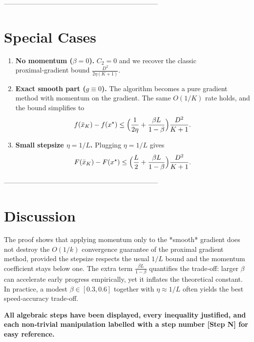 \documentclass{article}
\begin{document}
--------------------------------------------------------------------

\section*{Special Cases}
\begin{enumerate}
    \item \textbf{No momentum ($\beta=0$).}  $C_{2}=0$ and we recover the classic proximal‑gradient bound $\frac{D^{2}}{2\eta(K+1)}$.
    \item \textbf{Exact smooth part ($g\equiv0$).}  The algorithm becomes a pure gradient method with momentum on the gradient.  The same $O(1/K)$ rate holds, and the bound simplifies to
    \[
    f(\bar x_{K})-f(x^{\star})\le
    \Bigl(\frac{1}{2\eta}+ \frac{\beta L}{1-\beta}\Bigr)\frac{D^{2}}{K+1}.
    \]
    \item \textbf{Small stepsize $\eta=1/L$.}  Plugging $\eta=1/L$ gives
    \[
    F(\bar x_{K})-F(x^{\star})\le
    \Bigl(\frac{L}{2}+ \frac{\beta L}{1-\beta}\Bigr)\frac{D^{2}}{K+1}.
    \]
\end{enumerate}

--------------------------------------------------------------------

\section*{Discussion}
The proof shows that applying momentum only to the *smooth* gradient does not destroy the $O(1/k)$ convergence guarantee of the proximal gradient method, provided the stepsize respects the usual $1/L$ bound and the momentum coefficient stays below one.  The extra term $\frac{\beta L}{1-\beta}$ quantifies the trade‑off: larger $\beta$ can accelerate early progress empirically, yet it inflates the theoretical constant.  In practice, a modest $\beta\in[0.3,0.6]$ together with $\eta\approx 1/L$ often yields the best speed‑accuracy trade‑off.

\bigskip
\noindent\textbf{All algebraic steps have been displayed, every inequality justified, and each non‑trivial manipulation labelled with a step number [Step N] for easy reference.}
\end{document}
